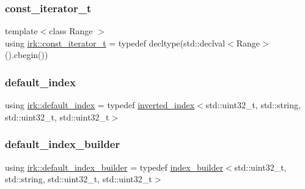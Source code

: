 \mbox{\label{namespaceirk_a90f7893fdbf95c6dcc2302148eb0bddb}} 
\subsubsection{\texorpdfstring{const\+\_\+iterator\+\_\+t}{const\_iterator\_t}}
{\footnotesize\ttfamily template$<$class Range $>$ \\
using \mbox{\hyperlink{namespaceirk_a90f7893fdbf95c6dcc2302148eb0bddb}{irk\+::const\+\_\+iterator\+\_\+t}} = typedef decltype(std\+::declval$<$Range$>$().cbegin())}

\mbox{\label{namespaceirk_af6ee69596c3b148bdec81164443f37f8}} 
\subsubsection{\texorpdfstring{default\+\_\+index}{default\_index}}
{\footnotesize\ttfamily using \mbox{\hyperlink{namespaceirk_af6ee69596c3b148bdec81164443f37f8}{irk\+::default\+\_\+index}} = typedef \mbox{\hyperlink{classirk_1_1inverted__index}{inverted\+\_\+index}}$<$std\+::uint32\+\_\+t, std\+::string, std\+::uint32\+\_\+t, std\+::uint32\+\_\+t$>$}

\mbox{\label{namespaceirk_af1d86af53878a68d661f3e8ea2dc06b9}} 
\subsubsection{\texorpdfstring{default\+\_\+index\+\_\+builder}{default\_index\_builder}}
{\footnotesize\ttfamily using \mbox{\hyperlink{namespaceirk_af1d86af53878a68d661f3e8ea2dc06b9}{irk\+::default\+\_\+index\+\_\+builder}} = typedef \mbox{\hyperlink{classirk_1_1index__builder}{index\+\_\+builder}}$<$std\+::uint32\+\_\+t, std\+::string, std\+::uint32\+\_\+t, std\+::uint32\+\_\+t$>$}

\mbox{\label{namespaceirk_a227068f98c83d33da43fab6a15633fb5}} 
